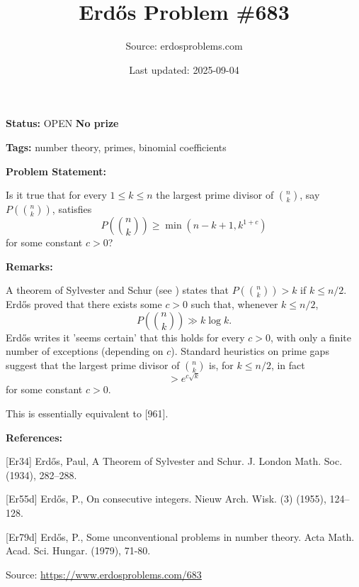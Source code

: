 \documentclass{article}
\title{Erd\H{o}s Problem \#683}
\date{Last updated: 2025-09-04}
\author{Source: erdosproblems.com}
\begin{document}
\maketitle

\noindent\textbf{Status:} OPEN \quad \textbf{No prize}

\noindent\textbf{Tags:} number theory, primes, binomial coefficients

\medskip
\noindent\textbf{Problem Statement:}

Is it true that for every $1\leq k\leq n$ the largest prime divisor of $\binom{n}{k}$, say $P(\binom{n}{k})$, satisfies\[P\left(\binom{n}{k}\right)\geq \min(n-k+1, k^{1+c})\]for some constant $c>0$?

\bigskip
\noindent\textbf{Remarks:}

A theorem of Sylvester and Schur (see \cite{Er34}) states that $P(\binom{n}{k})>k$ if $k\leq n/2$. Erd\H{o}s \cite{Er55d} proved that there exists some $c>0$ such that, whenever $k\leq n/2$,\[P\left(\binom{n}{k}\right)\gg k\log k.\]Erd\H{o}s \cite{Er79d} writes it 'seems certain' that this holds for every $c>0$, with only a finite number of exceptions (depending on $c$). Standard heuristics on prime gaps suggest that the largest prime divisor of $\binom{n}{k}$ is, for $k\leq n/2$, in fact\[>e^{c\sqrt{k}}\]for some constant $c>0$. 

This is essentially equivalent to [961].

\bigskip
\noindent\textbf{References:}

[Er34] Erd\H{o}s, Paul, A Theorem of Sylvester and Schur. J. London Math. Soc. (1934), 282--288.
 
 [Er55d] Erd\H{o}s, P., On consecutive integers. Nieuw Arch. Wisk. (3) (1955), 124--128.
 
 [Er79d] Erd\H{o}s, P., Some unconventional problems in number theory. Acta Math. Acad. Sci. Hungar. (1979), 71-80.

\bigskip
\noindent\small{Source: \url{https://www.erdosproblems.com/683}}
\end{document}
